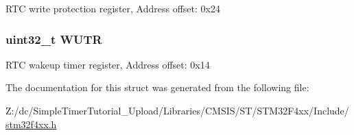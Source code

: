R\-T\-C write protection register, Address offset\-: 0x24 \hypertarget{struct_r_t_c___type_def_ac5b3c8be61045a304d3076d4714d29f2}{
\subsubsection[{W\-U\-T\-R}]{ uint32\-\_\-t W\-U\-T\-R}}\label{struct_r_t_c___type_def_ac5b3c8be61045a304d3076d4714d29f2}
R\-T\-C wakeup timer register, Address offset\-: 0x14 

The documentation for this struct was generated from the following file\-:\begin{DoxyCompactItemize}
\item 
Z\-:/dc/\-Simple\-Timer\-Tutorial\-\_\-\-Upload/\-Libraries/\-C\-M\-S\-I\-S/\-S\-T/\-S\-T\-M32\-F4xx/\-Include/\hyperlink{stm32f4xx_8h}{stm32f4xx.\-h}\end{DoxyCompactItemize}

